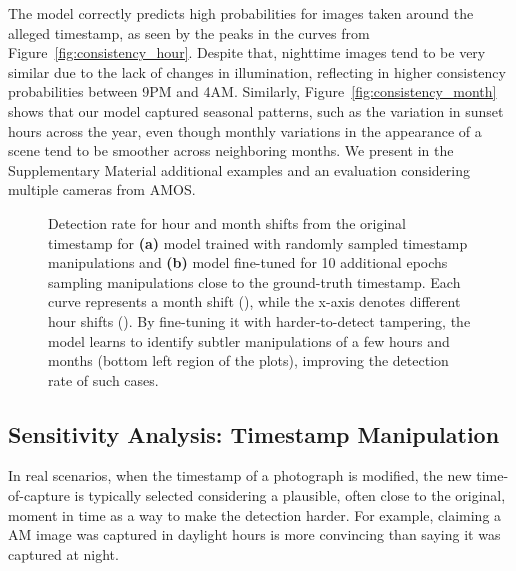 \documentclass[journal]{IEEEtran}
\begin{document}
        The model correctly predicts high probabilities for images taken around the alleged timestamp, as seen by the peaks in the curves from Figure~\ref{fig:consistency_hour}. Despite that, nighttime images tend to be very similar due to the lack of changes in illumination, reflecting in higher consistency probabilities between 9PM and 4AM. Similarly, Figure~\ref{fig:consistency_month} shows that our model captured seasonal patterns, such as the variation in sunset hours across the year, even though monthly variations in the appearance of a scene tend to be smoother across neighboring months. We present in the Supplementary Material additional examples and an evaluation considering multiple cameras from AMOS.
        
    

        \begin{figure*}\centering
            \hfill
            
            \caption{Detection rate for hour and month shifts from the original timestamp for \textbf{(a)} model trained with randomly sampled timestamp manipulations and \textbf{(b)} model fine-tuned for 10 additional epochs sampling manipulations close to the ground-truth timestamp. Each curve represents a month shift (), while the x-axis denotes different hour shifts (). By fine-tuning it with harder-to-detect tampering, the model learns to identify subtler manipulations of a few hours and months (bottom left region of the plots), improving the detection rate of such cases.}
            \label{fig:range_tampering}
        \end{figure*}
        
        

    \subsection{Sensitivity Analysis: Timestamp Manipulation}\label{sec:sensitivity_timestamp}
        In real scenarios, when the timestamp of a photograph is modified, the new time-of-capture is typically selected considering a plausible, often close to the original, moment in time as a way to make the detection harder. For example, claiming a \textsc{AM} image was captured in daylight hours is more convincing than saying it was captured at night.
        
\end{document}
